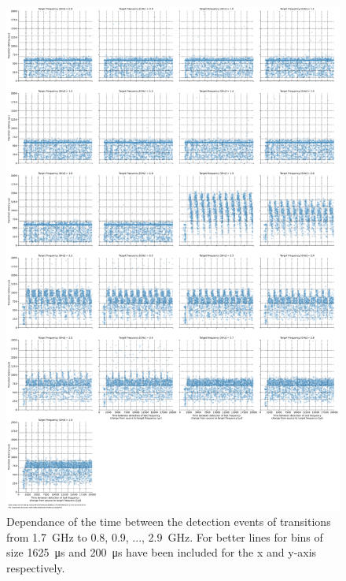\begin{figure}[]
    \centering
    \includegraphics[width=\columnwidth]{fig/ftalat/ftalat_scatter_wait_transition_latency_hati_source_1.7.pdf}
    \caption{Dependance of the time between the detection events of transitions from \SI{1.7}{\GHz} to \SI{0.8}{}, \SI{0.9}{}, ..., \SI{2.9}{\GHz}. For better lines for bins of size \SI{1625}{\us} and \SI{200}{\us} have been included for the x and y-axis respectively.}
\end{figure}
